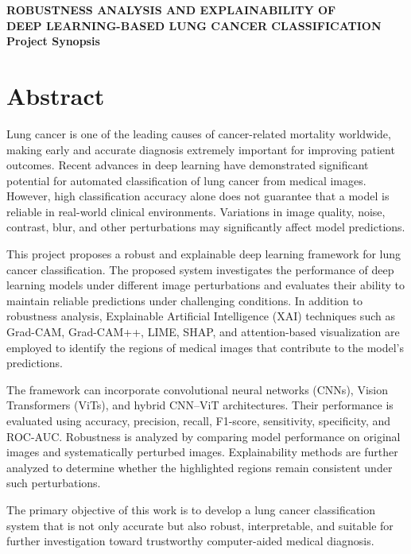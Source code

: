 \documentclass[12pt,a4paper]{article}
\begin{document}
\begin{center}
{\Large \textbf{ROBUSTNESS ANALYSIS AND EXPLAINABILITY OF}}\\[0.2cm]
{\Large \textbf{DEEP LEARNING-BASED LUNG CANCER CLASSIFICATION}}\\[0.6cm]
\textbf{Project Synopsis}\\[0.5cm]
\end{center}

\section{Abstract}

Lung cancer is one of the leading causes of cancer-related mortality worldwide, making early and accurate diagnosis extremely important for improving patient outcomes. Recent advances in deep learning have demonstrated significant potential for automated classification of lung cancer from medical images. However, high classification accuracy alone does not guarantee that a model is reliable in real-world clinical environments. Variations in image quality, noise, contrast, blur, and other perturbations may significantly affect model predictions.

This project proposes a robust and explainable deep learning framework for lung cancer classification. The proposed system investigates the performance of deep learning models under different image perturbations and evaluates their ability to maintain reliable predictions under challenging conditions. In addition to robustness analysis, Explainable Artificial Intelligence (XAI) techniques such as Grad-CAM, Grad-CAM++, LIME, SHAP, and attention-based visualization are employed to identify the regions of medical images that contribute to the model's predictions.

The framework can incorporate convolutional neural networks (CNNs), Vision Transformers (ViTs), and hybrid CNN--ViT architectures. Their performance is evaluated using accuracy, precision, recall, F1-score, sensitivity, specificity, and ROC-AUC. Robustness is analyzed by comparing model performance on original images and systematically perturbed images. Explainability methods are further analyzed to determine whether the highlighted regions remain consistent under such perturbations.

The primary objective of this work is to develop a lung cancer classification system that is not only accurate but also robust, interpretable, and suitable for further investigation toward trustworthy computer-aided medical diagnosis.
\end{document}
